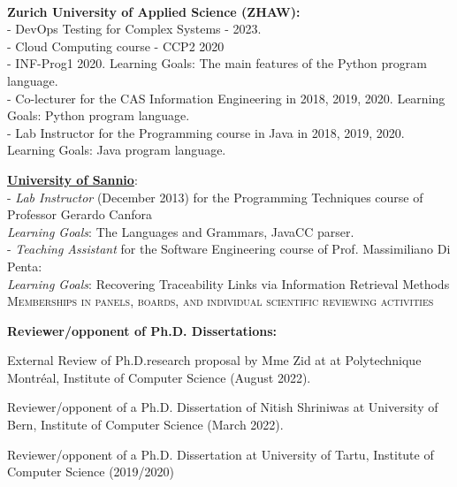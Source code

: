 \documentclass[11pt]{article}
\begin{document}
\medskip \\
\textbf{Zurich University of Applied Science (ZHAW):}
\medskip \\
- DevOps Testing for Complex Systems - 2023. \\
- Cloud Computing course - CCP2 2020\\
- INF-Prog1 2020. Learning Goals: The main features of the Python program language.\\
- Co-lecturer for the CAS Information Engineering in 2018, 2019, 2020.
Learning Goals: Python program language.\\
- Lab Instructor for the Programming course in Java in 2018, 2019, 2020.
Learning Goals: Java program language.
\medskip 
\vspace{-5mm} 

\href{http://www.unisa.it}{\textbf{University of Sannio}}:
\medskip\\
- \textit{Lab Instructor} (December 2013) for the Programming Techniques course of Professor Gerardo Canfora\\   \textit{Learning Goals}:   The Languages ​​and Grammars, JavaCC parser.\\
- \textit{Teaching Assistant } for the Software Engineering course of Prof. Massimiliano Di Penta:\\   \textit{Learning Goals}:   
Recovering Traceability Links via Information Retrieval Methods
\medskip\medskip \\
\textsc{Memberships in panels, boards, and individual scientific reviewing activities}

\medskip 

\textbf{Reviewer/opponent of Ph.D. Dissertations:}
\begin{innerlist}
   \item External Review of Ph.D.research proposal  by Mme Zid at at Polytechnique Montréal, Institute of Computer Science (August 2022).
   \item Reviewer/opponent of a Ph.D. Dissertation   of Nitish Shriniwas at University of Bern, Institute of Computer Science (March 2022).
   \item Reviewer/opponent of a Ph.D. Dissertation  at University of Tartu, Institute of Computer Science (2019/2020)
\end{innerlist}
\medskip 
\end{document}
